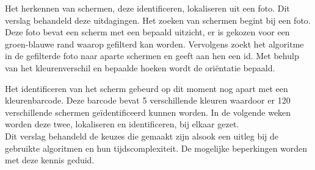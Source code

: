 Het herkennen van schermen, deze identificeren, lokaliseren uit een foto. Dit verslag behandeld deze uitdagingen. Het zoeken van schermen begint bij een foto. Deze foto bevat een scherm met een bepaald uitzicht, er is gekozen voor een groen-blauwe rand waarop gefilterd kan worden. Vervolgens zoekt het algoritme in de gefilterde foto naar aparte schermen en geeft aan hen een id. Met behulp van het kleurenverschil en bepaalde hoeken wordt de oriëntatie bepaald.

Het identificeren van het scherm gebeurd op dit moment nog apart met een kleurenbarcode. Deze barcode bevat 5 verschillende kleuren waardoor er 120 verschillende schermen geïdentificeerd kunnen worden. In de volgende weken worden deze twee, lokaliseren en identificeren, bij elkaar gezet.
\\
Dit verslag behandeld de keuzes die gemaakt zijn alsook een uitleg bij de gebruikte algoritmen en hun tijdscomplexiteit. De mogelijke beperkingen worden met deze kennis geduid.